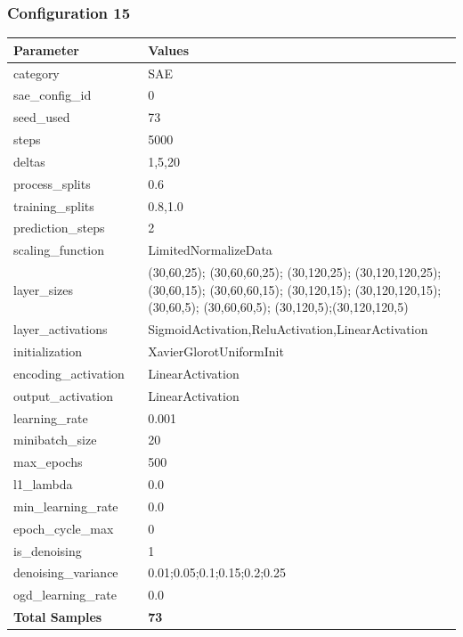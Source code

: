 \documentclass[a4paper,11pt,oneside]{article}
\theoremstyle{plain}
\theoremstyle{definition}
\begin{document}
	\subsubsection{Configuration 15}\label{config15}
	
	\begin{longtable}[H]{|p{0.3\linewidth}|p{0.7\linewidth}|} \hline \textbf{Parameter} &\textbf{Values} \\\hline{category} & {SAE} \\\hline
		{sae\_config\_id} & {0} \\\hline
		{seed\_used} & {73} \\\hline
		{steps} & {5000} \\\hline
		{deltas} & {1,5,20} \\\hline
		{process\_splits} & {0.6} \\\hline
		{training\_splits} & {0.8,1.0} \\\hline
		{prediction\_steps} & {2} \\\hline
		{scaling\_function} & {LimitedNormalizeData} \\\hline
		{layer\_sizes} & {(30,60,25); (30,60,60,25); (30,120,25); (30,120,120,25); (30,60,15); (30,60,60,15); (30,120,15); (30,120,120,15); (30,60,5); (30,60,60,5); (30,120,5);(30,120,120,5)} \\\hline
		{layer\_activations} & {SigmoidActivation,ReluActivation,LinearActivation} \\\hline
		{initialization} & {XavierGlorotUniformInit} \\\hline
		{encoding\_activation} & {LinearActivation} \\\hline
		{output\_activation} & {LinearActivation} \\\hline
		{learning\_rate} & {0.001} \\\hline
		{minibatch\_size} & {20} \\\hline
		{max\_epochs} & {500} \\\hline
		{l1\_lambda} & {0.0} \\\hline
		{min\_learning\_rate} & {0.0} \\\hline
		{epoch\_cycle\_max} & {0} \\\hline
		{is\_denoising} & {1} \\\hline
		{denoising\_variance} & {0.01;0.05;0.1;0.15;0.2;0.25} \\\hline
		{ogd\_learning\_rate} & {0.0} \\\hline
		{\textbf{Total Samples}} & {\textbf{73}} \\\hline
	\end{longtable}
	
\end{document}
